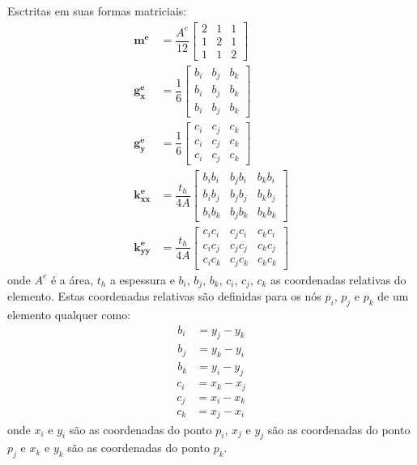 Esctritas em suas formas matriciais\cite{lewis}:
\begin{align}
    \mathbf{m^e} &=
    \dfrac{A^e}{12}
    \begin{bmatrix} 
        2 & 1 & 1 \\
        1 & 2 & 1 \\
        1 & 1 & 2
    \end{bmatrix} \\
    \mathbf{g_x^e} &=
    \dfrac{1}{6}
    \begin{bmatrix} 
        b_i & b_j & b_k \\
        b_i & b_j & b_k \\
        b_i & b_j & b_k
    \end{bmatrix} \\
    \mathbf{g_y^e} &=
    \dfrac{1}{6}
    \begin{bmatrix} 
        c_i & c_j & c_k \\
        c_i & c_j & c_k \\
        c_i & c_j & c_k
    \end{bmatrix} \\
    \mathbf{k_{xx}^e} &=
    \dfrac{t_h}{4A}
    \begin{bmatrix} 
        b_i b_i & b_j b_i & b_k b_i \\
        b_i b_j & b_j b_j & b_k b_j \\
        b_i b_k & b_j b_k & b_k b_k
    \end{bmatrix} \\
    \mathbf{k_{yy}^e} &=
    \dfrac{t_h}{4A}
    \begin{bmatrix} 
        c_i c_i & c_j c_i & c_k c_i \\
        c_i c_j & c_j c_j & c_k c_j \\
        c_i c_k & c_j c_k & c_k c_k
    \end{bmatrix}
\end{align}
onde $A^e$ é a área, $t_h$ a espessura e $b_i$, $b_j$, $b_k$, $c_i$, $c_j$, $c_k$ as coordenadas relativas do elemento.
Estas coordenadas relativas são definidas para os nós $p_i$, $p_j$ e $p_k$ de um elemento qualquer como:
\begin{align}
    b_i &= y_j - y_k \\
    b_j &= y_k - y_i \\
    b_k &= y_i - y_j
\end{align}
\begin{align}
    c_i &= x_k - x_j \\
    c_j &= x_i - x_k \\
    c_k &= x_j - x_i
\end{align}
onde $x_i$ e $y_i$ são as coordenadas do ponto $p_i$, $x_j$ e $y_j$ são as coordenadas do ponto $p_j$ e $x_k$ e $y_k$ são as coordenadas do ponto $p_k$.

